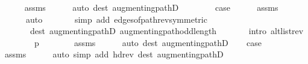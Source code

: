 \begin{isabellebody}
\ \ \ \ \isamarkupfalse%
\ assms\isanewline
\ \ \ \ \isamarkupfalse%
\ {\isacharparenleft}{\kern0pt}auto\ dest{\isacharcolon}{\kern0pt}\ augmenting{\isacharunderscore}{\kern0pt}pathD{\isacharparenleft}{\kern0pt}{}{\isacharparenright}{\kern0pt}{\isacharparenright}{\kern0pt}\isanewline
{}\isamarkupfalse%
\isanewline
\ \ \isamarkupfalse%
\ {}\isanewline
\ \ \isamarkupfalse%
\ {\isacharquery}{\kern0pt}case\isanewline
\ \ \ \ \isamarkupfalse%
\ assms\isanewline
\ \ \ \ \isamarkupfalse%
\isanewline
\ \ \ \ \ \ {\isacharparenleft}{\kern0pt}auto\isanewline
\ \ \ \ \ \ \ simp\ add{\isacharcolon}{\kern0pt}\ edges{\isacharunderscore}{\kern0pt}of{\isacharunderscore}{\kern0pt}path{\isacharunderscore}{\kern0pt}rev{\isacharbrackleft}{\kern0pt}symmetric{\isacharbrackright}{\kern0pt}\isanewline
\ \ \ \ \ \ \ dest{\isacharcolon}{\kern0pt}\ augmenting{\isacharunderscore}{\kern0pt}pathD{\isacharparenleft}{\kern0pt}{}{\isacharparenright}{\kern0pt}\ augmenting{\isacharunderscore}{\kern0pt}path{\isacharunderscore}{\kern0pt}odd{\isacharunderscore}{\kern0pt}length\isanewline
\ \ \ \ \ \ \ intro{\isacharcolon}{\kern0pt}\ alt{\isacharunderscore}{\kern0pt}list{\isacharunderscore}{\kern0pt}rev{\isacharparenright}{\kern0pt}\isanewline
{}\isamarkupfalse%
\isanewline
\ \ \isamarkupfalse%
\ {}\isanewline
\ \ \isamarkupfalse%
\ {\isachardoublequoteopen}p\ {\isasymnoteq}\ {\isacharbrackleft}{\kern0pt}{\isacharbrackright}{\kern0pt}{\isachardoublequoteclose}\isanewline
\ \ \ \ \isamarkupfalse%
\ assms\isanewline
\ \ \ \ \isamarkupfalse%
\ {\isacharparenleft}{\kern0pt}auto\ dest{\isacharcolon}{\kern0pt}\ augmenting{\isacharunderscore}{\kern0pt}pathD{\isacharparenleft}{\kern0pt}{}{\isacharparenright}{\kern0pt}{\isacharparenright}{\kern0pt}\isanewline
\ \ \isamarkupfalse%
\ {\isacharquery}{\kern0pt}case\isanewline
\ \ \ \ \isamarkupfalse%
\ assms\isanewline
\ \ \ \ \isamarkupfalse%
\ {\isacharparenleft}{\kern0pt}auto\ simp\ add{\isacharcolon}{\kern0pt}\ hd{\isacharunderscore}{\kern0pt}rev\ dest{\isacharcolon}{\kern0pt}\ augmenting{\isacharunderscore}{\kern0pt}pathD{\isacharparenleft}{\kern0pt}{}{\isacharparenright}{\kern0pt}{\isacharparenright}{\kern0pt}\isanewline
{}\isamarkupfalse%
\isanewline
\ \ \isamarkupfalse%
\ {}\isanewline
\ \ \isamarkupfalse%

\end{isabellebody}
